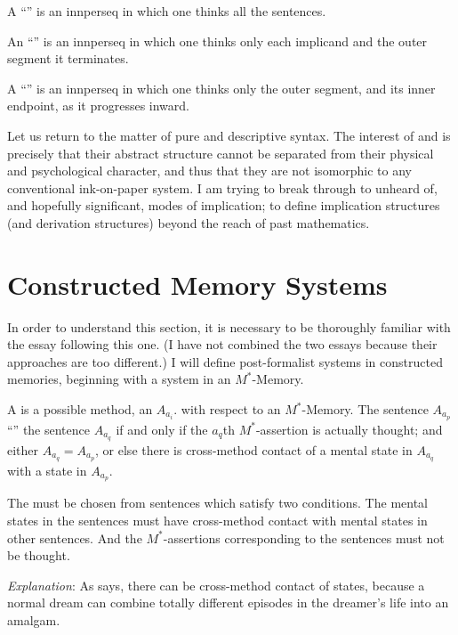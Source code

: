 
\begin{sysrules}
A \enquote{} is an innperseq in which one thinks all the 
sentences. 

An \enquote{} is an innperseq in which one thinks 
only each implicand and the outer segment it terminates. 

A \enquote{} is an innperseq in which one thinks 
only the outer segment, and its inner endpoint, as it progresses inward. 
\end{sysrules}


Let us return to the matter of pure and descriptive syntax. The interest 
of  and  is precisely that their abstract structure 
cannot be separated from their physical and psychological character, and 
thus that they are not isomorphic to any conventional ink-on-paper system. I 
am trying to break through to unheard of, and hopefully significant, modes 
of implication; to define implication structures (and derivation structures) 
beyond the reach of past mathematics. 

\clearpage
\section{Constructed Memory Systems}

In order to understand this section, it is necessary to be thoroughly 
familiar with  the essay following this 
one. (I have not combined the two essays because their approaches are too 
different.) I will define post-formalist systems in constructed memories, 
beginning with a system in an $M^*$-Memory. 


\begin{sysrules}
A  is a possible method, an $A_{a_i}$. with respect to an $M^*$-Memory. 
The sentence $A_{a_p}$ \enquote{} the sentence $A_{a_q}$ if and only if the $a_q$th 
$M^*$-assertion is actually thought; and either $A_{a_q} = A_{a_p}$, or else there is 
cross-method contact of a mental state in $A_{a_q}$ with a state in $A_{a_p}$.

The  must be chosen from sentences which satisfy two conditions. 
The mental states in the sentences must have cross-method contact 
with mental states in other sentences. And the $M^*$-assertions 
corresponding to the sentences must not be thought. 

\emph{Explanation}: As  says, there can be 
cross-method contact of states, because a normal dream can 
combine totally different episodes in the dreamer's life into an 
amalgam. 
\end{sysrules}

